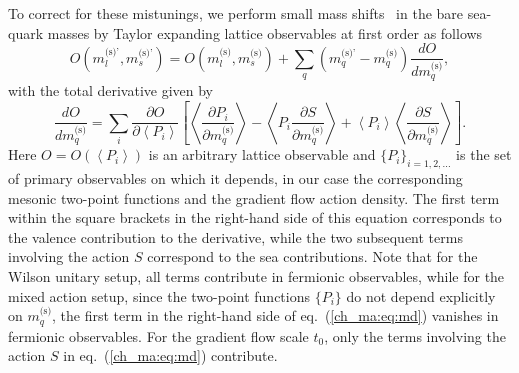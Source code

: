 To correct for these mistunings, we perform small mass shifts~\citep{Bruno:2016plf} in the bare sea-quark masses by Taylor expanding lattice observables at first order as follows
\begin{equation}
\label{ch_ma:eq:mass_shift}
{O}\left(m_l^{\textrm{(s)'}},m_s^{\textrm{(s)'}}\right)={O}\left(m_l^{\textrm{(s)}},m_s^{\textrm{(s)}}\right)+\sum_q\left(m_q^{\textrm{(s)'}}-m_q^{\textrm{(s)}}\right)\frac{d{O}}{dm_q^{\textrm{(s)}}},
\end{equation}
with the total derivative given by
\begin{equation}
\label{ch_ma:eq:md}
\frac{d{O}}{dm_q^{\textrm{(s)}}}=\sum_i\frac{\partial{O}}{\partial \left<P_i\right>}\left[\left<\frac{\partial P_i}{\partial m_q^{\textrm{(s)}}}\right>-\left<P_i\frac{\partial S}{\partial m_q^{\textrm{(s)}}}\right>+\left<P_i\right>\left<\frac{\partial S}{\partial m_q^{\textrm{(s)}}}\right>\right].
\end{equation}
Here $O=O\left(\left<P_i\right>\right)$ is an arbitrary lattice observable and $\{P_i\}_{i=1,2,...}$ is the set of primary observables on which it depends, in our case the corresponding mesonic two-point functions and the gradient flow action density. The first term within the square brackets in the right-hand side of this equation corresponds to the valence contribution to the derivative, while the two subsequent terms involving the action $S$ correspond to the sea contributions. Note that for the Wilson unitary setup, all terms contribute in fermionic observables, while for the mixed action setup, since the two-point functions $\{P_i\}$ do not depend explicitly on $m_q^{\textrm{(s)}}$, the first term in the right-hand side of eq.~(\ref{ch_ma:eq:md}) vanishes in fermionic observables. For the gradient flow scale $t_0$, only the terms involving the action $S$ in eq.~(\ref{ch_ma:eq:md}) contribute.

